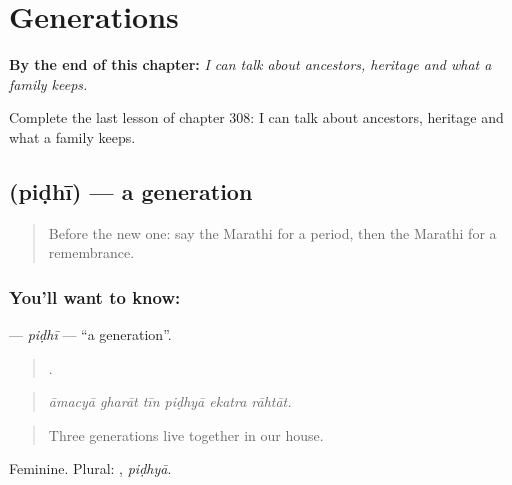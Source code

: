 
\chapter{Generations}
\label{ch:mr-generations}

\begin{chapteropening}
\textbf{By the end of this chapter:} \emph{I can talk about ancestors, heritage and what a family keeps.}

Complete the last lesson of chapter 308: I can talk about ancestors, heritage and what a family keeps.
\end{chapteropening}

\section[\texorpdfstring{\mr{पिढी} (piḍhī)}{पिढी (piḍhī)}]{ (piḍhī) — a generation}

\label{lesson:MR-C308-pidhi}



\begin{quote}
Before the new one: say the Marathi for a period, then the Marathi for a remembrance.
\end{quote}

\subsection*{You'll want to know: }
\textbf{} — \emph{piḍhī} — \textquotedblleft{}a generation\textquotedblright{}.

\begin{quote}
     .
\end{quote}

\begin{quote}
\emph{āmacyā gharāt tīn piḍhyā ekatra rāhtāt.}
\end{quote}

\begin{quote}
Three generations live together in our house.
\end{quote}

Feminine. Plural: , \emph{piḍhyā}.

